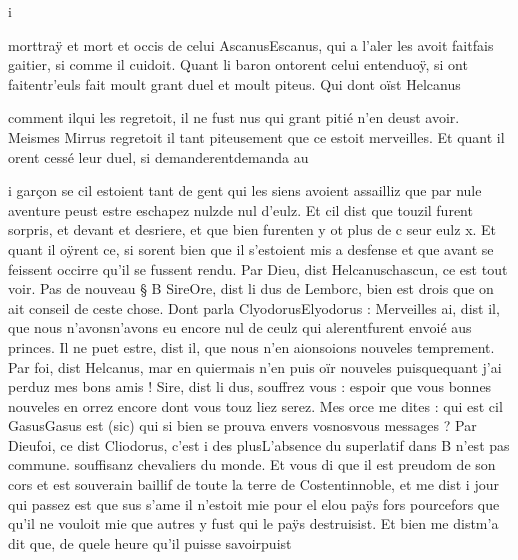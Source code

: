\documentclass{article}
\begin{document}
\begin{pages}
                     i
                  
                     morttraÿ et mort et occis de celui 
                        AscanusEscanus, 
                     qui a l’aler les avoit 
                     faitfais gaitier, si comme il cuidoit. \pend
            \pstart Quant li baron 
                  ontorent celui 
                  entenduoÿ, si ont 
                  faitentr'euls fait moult grant duel et moult piteus. Qui dont oïst Helcanus
               
                  comment ilqui les regretoit, il ne fust nus qui grant pitié n’en deust avoir. Meismes
                  Mirrus regretoit il tant piteusement que ce
               estoit merveilles. Et quant il orent cessé 
                  leur duel, si 
                  demanderentdemanda au 
                  
                  i
               garçon se cil estoient tant de gent qui les siens avoient assailliz que par
                  nule aventure peust estre eschapez 
                     nulzde nul d’eulz. Et cil dist que 
                     touzil furent sorpris, et devant et desriere, et que bien 
                     furenten y ot plus de
                  c seur eulz x. Et quant il oÿrent ce, si sorent bien
               que il s’estoient mis a desfense et 
                  que avant se feissent occirre qu’il se fussent rendu. Par Dieu, dist 
                     Helcanuschascun, ce est tout voir. \pend
            \pstart Pas de nouveau § B
                     SireOre, dist li dus de Lemborc, bien est drois que on ait conseil de ceste
                  chose. Dont parla 
                  ClyodorusElyodorus : Merveilles ai, dist il, que nous 
                     n’avonsn'avons eu encore nul de ceulz qui 
                     alerentfurent envoié aus princes. Il ne puet estre, dist il, que nous n’en 
                     aionsoions nouveles temprement.
               Par foi, dist Helcanus, 
                     mar en quiermais n'en puis oïr nouveles 
                     puisquequant j’ai perduz mes bons amis !
               Sire, dist li
                     dus, souffrez vous : espoir que vous bonnes nouveles en orrez encore dont
                  vous touz liez serez. Mes 
                     orce me dites : qui est cil 
                     GasusGasus est (sic) qui si bien se prouva envers 
                     vosnosvous messages ?
                Par 
                     Dieufoi, 
                     ce dist Cliodorus, c’est i des 
                     plusL'absence du superlatif dans B n'est pas
                     commune. souffisanz chevaliers du monde. Et vous di que il est preudom de son cors et est souverain baillif de toute la terre de Costentinnoble, et me dist i jour qui passez
                  est que sus s'ame il n’estoit mie 
                        pour el elou paÿs 
                        fors pourcefors que qu’il ne vouloit mie que autres y fust qui le paÿs destruisist.
                  Et bien 
                     me distm'a dit que, de quele heure qu’il 
                        puisse savoirpuist
                     

\end{pages}
\end{document}
